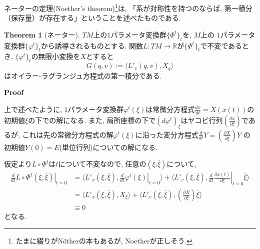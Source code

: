 \documentclass[a4paper]{ujarticle}
\makeatletter
\numberwithin{equation}{section}
\theoremstyle{definition}
\newtheorem{theorem}{Theorem}
\renewenvironment{proof}[1][Proof]{\par
  \pushQED{\qed}%
  \normalfont \topsep6\p@\@plus6\p@\relax
  \trivlist
  \item\relax
  {\bfseries
  #1\@addpunct{.}}\hspace\labelsep\ignorespaces
}{%
  \popQED\endtrivlist\@endpefalse
}
\makeatother
\begin{document}
    ネーターの定理(Noether's theorem)\footnote{たまに綴りがN\"{o}therの本もあるが, Noetherが正しそう.}は, 「系が対称性を持つのならば, 第一積分（保存量）が存在する」ということを述べたものである.
    \begin{theorem}[ネーター]
        $TM$上の$1$パラメータ変換群$\{\Phi^{t}\}_{t}$を, 
        $M$上の $1$パラメータ変換群$\{\varphi^{t}\}_{t}$から誘導されるものとする.
        関数$L: TM \rightarrow \mathbb{R}$が$\{\Phi^{t}\}_{t}$で不変であるとき,
        $\{\varphi^{t}\}_{t}$の無限小変換を$X$とすると
        \[
            G(q, v) := \langle L'_v(q, v), X_q\rangle
        \]
        はオイラー-ラグランジュ方程式の第一積分である.
    \end{theorem}
    \begin{proof}
        上で述べたように, $1$パラメータ変換群$\varphi^{t}(\xi)$は常微分方程式$\frac{dx}{dt} = X(x(t))$の初期値$\xi$の下での解になる.
        また, 局所座標の下で$(d \varphi^{t})_{\xi}$はヤコビ行列$\displaystyle \left(\frac{\partial x}{\partial \xi}\right)$であるが,
        これは先の常微分方程式の解$\varphi^{t}(\xi)$に沿った変分方程式$\displaystyle \frac{d}{dt} Y = \left(\frac{\partial X}{\partial \xi}\right) Y$
        の初期値$Y(0) = E$(単位行列)についての解になる.

        仮定より$L \circ \Phi^{t}$は$t$について不変なので, 任意の$(\xi. \bar{\xi})$について,
        \begin{align}
            \left. \frac{d}{d t} L \circ \Phi^{t}(\xi, \bar{\xi})\right|_{t = 0}
            &= \langle L'_x(\xi, \bar{\xi}), \left. \frac{d}{d t} \varphi^{t}(\xi)\right|_{t = 0} \rangle + \langle L'_v(\xi, \bar{\xi}), \left. \frac{d}{d t} \frac{\partial x(t)}{\partial \xi}\right|_{t = 0}\bar{\xi} \rangle\\
            &= \langle L'_x(\xi, \bar{\xi}), X_{\xi}\rangle + \langle L'_v(\xi, \bar{\xi}), \left(\frac{\partial X}{\partial \xi}\right)\bar{\xi}\rangle\\
            &\equiv 0
        \end{align}
        となる.


\end{proof}
\end{document}
